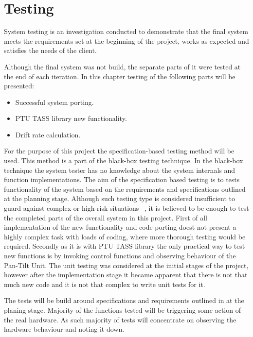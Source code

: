\chapter{Testing}
System testing is an investigation conducted to demonstrate that the final system meets the requirements set at the beginning of the project, works as expected and satisfies the needs of the client.

Although the final system was not build, the separate parts of it were tested at the end of each iteration. In this chapter testing of the following parts will be presented:

\begin{itemize}
\item Successful system porting.
\item PTU TASS library new functionality.
\item Drift rate calculation. 
\end{itemize}

For the purpose of this project the specification-based testing method will be used. This method is a part of the black-box testing technique. In the black-box technique the system tester has no knowledge about the system internals and function implementations. The aim of the specification based testing is to tests functionality of the system based on the requirements and specifications outlined at the planning stage. Although such testing type is considered insufficient to guard against complex or high-risk situations ~\cite{RiskandRequirementsBasedTesting}, it is believed to be enough to test the completed parts of the overall system in this project. First of all implementation of the new functionality and code porting doest not present a highly complex task with loads of coding, where more thorough testing would be required. Secondly as it is with PTU TASS library the only practical way to test new functions is by invoking control functions and observing behaviour of the Pan-Tilt Unit. The unit testing was considered at the initial stages of the project, however after the implementation stage it became apparent that there is not that much new code and it is not that complex to write unit tests for it.    

The tests will be build around specifications and requirements outlined in at the planing stage. Majority of the functions tested will be triggering some action of the real hardware. As such majority of tests will concentrate on observing the hardware behaviour and noting it down.


